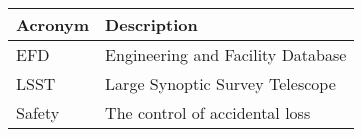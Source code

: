 \addtocounter{table}{-1}
\begin{longtable}{p{}p{}}\hline
\textbf{Acronym} & \textbf{Description}  \\\hline

EFD & Engineering and Facility Database \\\hline
LSST & Large Synoptic Survey Telescope \\\hline
Safety & The control of accidental loss \\\hline
\end{longtable}
